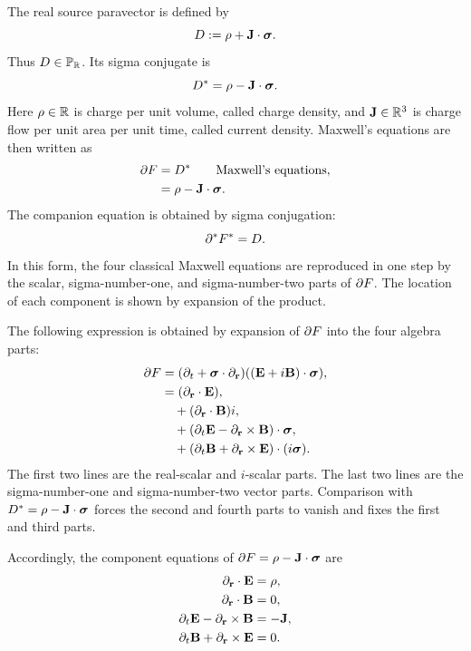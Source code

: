 The real source paravector is defined by
\begin{equation}
D:=\rho+\mathbf{J}\cdot\mathbf{\bm{\sigma}}.
\label{eq:source-paravector}
\end{equation}
Thus \(D\in\mathbb{P}_{\mathbb{R}}\).
Its sigma conjugate is
\begin{equation*}
D^{*}=\rho-\mathbf{J}\cdot\mathbf{\bm{\sigma}}.
\end{equation*}
Here \(\rho\in\mathbb{R}\) is charge per unit volume, called charge density, and
\(\mathbf{J}\in\mathbb{R}^3\) is charge flow per unit area per unit time, called
current density. Maxwell's equations are then written as
\begin{align*}
\pv{\partial}\pv{F} &= \pv{D}^{*}\qquad \text{Maxwell's equations},\notag \\
&= \rho - \vct{J} \cdot \sigv.
\end{align*}
The companion equation is obtained by sigma conjugation:
\begin{equation*}
\partial^{*} F^{*} = D.
\end{equation*}
In this form, the four classical Maxwell equations are reproduced in one step by the scalar, sigma-number-one, and sigma-number-two parts of \(\partial F\). The location of each component is shown by expansion of the product.

The following expression is obtained by expansion of
\(\partial F\) into the four algebra parts:
\begin{align*}
\partial F &= (\partial _{t} + \mathbf{\bm{\sigma}} \cdot \partial_{\mathbf{r}}) ( (\mathbf{E} + i \mathbf{B}) \cdot \mathbf{\bm{\sigma}} ),\notag \\
&= ( \partial_{\mathbf{r}} \cdot \mathbf{E} ),\notag \\
&\quad + ( \partial_{\mathbf{r}} \cdot \mathbf{B} ) i,\notag \\
&\quad + (\partial _{t} \mathbf{E} - \partial_{\mathbf{r}} \times \mathbf{B}) \cdot \mathbf{\bm{\sigma}},\notag \\
&\quad + (\partial _{t} \mathbf{B} + \partial_{\mathbf{r}} \times \mathbf{E}) \cdot (i \mathbf{\bm{\sigma}} ).
\end{align*}
The first two lines are the real-scalar and \(i\)-scalar parts. The last two
lines are the sigma-number-one and sigma-number-two vector parts. Comparison
with \(D^*=\rho-\mathbf{J}\cdot\mathbf{\bm{\sigma}}\) forces the second and fourth
parts to vanish and fixes the first and third parts.

Accordingly, the component equations of \(\partial F=\rho-\mathbf{J}\cdot\mathbf{\bm{\sigma}}\) are
\begin{align*}
\partial_{\mathbf{r}} \cdot \mathbf{E} &= \rho, \\
\partial_{\mathbf{r}} \cdot \mathbf{B} &= 0, \\
\partial_t \mathbf{E} - \partial_{\mathbf{r}} \times \mathbf{B} &= -\mathbf{J}, \\
\partial_t \mathbf{B} + \partial_{\mathbf{r}} \times \mathbf{E} &= 0.
\end{align*}

